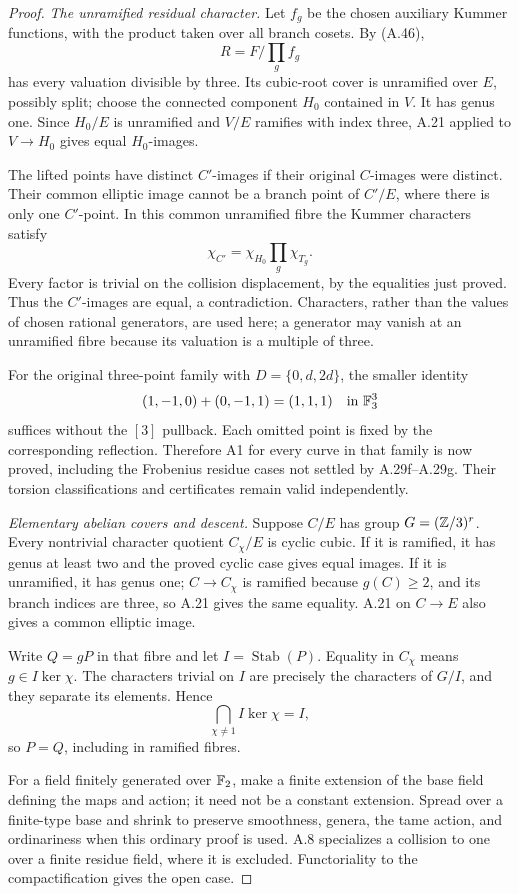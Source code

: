 \begin{proof}
\emph{The unramified residual character.}
Let $f_g$ be the chosen auxiliary Kummer functions, with
the product taken over all branch cosets. By (A.46),
\[
 R=F/\prod_g f_g
\]
has every valuation divisible by three. Its cubic-root
cover is unramified over $E$, possibly split; choose the
connected component $H_0$ contained in $V$. It has genus
one. Since $H_0/E$ is unramified and $V/E$ ramifies with
index three, A.21 applied to $V\to H_0$ gives equal
$H_0$-images.

The lifted points have distinct $C'$-images if their
original $C$-images were distinct. Their common elliptic
image cannot be a branch point of $C'/E$, where there is
only one $C'$-point. In this common unramified fibre the
Kummer characters satisfy
\[
 \chi_{C'}=\chi_{H_0}\prod_g\chi_{T_g}.
\]
Every factor is trivial on the collision displacement,
by the equalities just proved. Thus the $C'$-images are
equal, a contradiction. Characters, rather than the
values of chosen rational generators, are used here;
a generator may vanish at an unramified fibre because
its valuation is a multiple of three.

For the original three-point family with
$D=\{0,d,2d\}$, the smaller identity
\[
 (1,-1,0)+(0,-1,1)=(1,1,1)\quad\text{in }\mathbb F_3^3
\]
suffices without the $[3]$ pullback. Each omitted point
is fixed by the corresponding reflection. Therefore
A1 for every curve in that family is now proved,
including the Frobenius residue cases not settled by
A.29f--A.29g. Their torsion classifications and
certificates remain valid independently.

\emph{Elementary abelian covers and descent.}
Suppose $C/E$ has group $G=(\mathbb Z/3)^r$. Every nontrivial
character quotient $C_\chi/E$ is cyclic cubic. If it is
ramified, it has genus at least two and the proved
cyclic case gives equal images. If it is unramified,
it has genus one; $C\to C_\chi$ is ramified because
$g(C)\ge2$, and its branch indices are three, so A.21
gives the same equality. A.21 on $C\to E$ also gives a
common elliptic image.

Write $Q=gP$ in that fibre and let $I=\operatorname{Stab}(P)$.
Equality in $C_\chi$ means $g\in I\ker\chi$.
The characters trivial on $I$ are precisely the
characters of $G/I$, and they separate its elements.
Hence
\[
 \bigcap_{\chi\ne1}I\ker\chi=I,
\]
so $P=Q$, including in ramified fibres.

For a field finitely generated over $\mathbb F_2$, make a finite
extension of the base field defining the maps and action;
it need not be a constant extension. Spread over a
finite-type base and shrink to preserve smoothness,
genera, the tame action, and ordinariness when this
ordinary proof is used. A.8 specializes a collision
to one over a finite residue field, where it is excluded.
Functoriality to the compactification gives the open case.


\end{proof}
